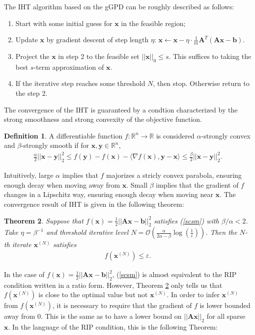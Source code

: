 \documentclass[11pt]{article}
\numberwithin{equation}{section}
\theoremstyle{plain}
\newtheorem{Th}{Theorem}[section]
\theoremstyle{definition}
\newtheorem{Def}[Th]{Definition}
\def\R{{\mathbb R}}
\def\R{{\mathbb R}}
\def\A{{\mathbf A}}
\def\x{{\mathbf x}}
\def\b{{\mathbf b}}
\def\e{{\varepsilon}}
\def\y{{\mathbf{y}}}
\begin{document}
The IHT algorithm based on the gGPD can be roughly described as follows:
\begin{enumerate}
\item Start with some initial guess for $\x$ in the feasible region;
\item Update $\x$ by gradient descent of step length $\eta$: $\x\leftarrow \x-\eta\cdot\frac{1}{m}\A^T(\A\x-\b)$.  
\item Project the $\x$ in step 2 to the feasible set $||\x||_0\leq s$. This suffices to taking the best $s$-term approximation of $\x$. 
\item If the iterative step reaches some threshold $N$, then stop. Otherwise return to the step 2. 
\end{enumerate}  

The convergence of the IHT is guaranteed by a condtion characterized by the strong smoothness and strong convexity of the objective function.
\begin{Def}
A differentiable function $f:\R^n\rightarrow\R$ is considered $\alpha$-strongly convex and $\beta$-strongly smooth if for $\x, \y\in\R^n$,
\begin{align}
\frac{\alpha}{2}||\x-\y||_2^2\leq f(\y)-f(\x)-\langle\nabla f(\x), \y-\x\rangle\leq\frac{\beta}{2}||\x-\y||_2^2.\label{scsm} 
\end{align}
\end{Def}
Intuitively, large $\alpha$ implies that $f$ majorizes a stricly convex parabola, ensuring enough decay when moving away from $\x$. Small $\beta$ implies that  the gradient of $f$ changes in a Lipschitz way, ensuring enough decay when moving near $\x$. The convergence result of IHT is given in the following theorem:
\begin{Th}\label{IHT-1}
Suppose that $f(\x)=\frac{1}{2}||\A\x-\b||_2^2$ satisfies (\ref{scsm}) with $\beta/\alpha<2$. Take $\eta=\beta^{-1}$ and threshold iterative level $N=\mathcal{O}\left(\frac{\alpha}{2\alpha-\beta}\log(\frac{1}{\e})\right)$. Then the $N$-th iterate $\x^{(N)}$ satisfies 
\begin{align}
f(\x^{(N)})\leq\e. 
\end{align} 
\end{Th}
In the case of $f(\x)=\frac{1}{2}||\A\x-\b||_2^2$, (\ref{scsm}) is almost equivalent to the RIP condition written in a ratio form. However, Theorem \ref{IHT-1} only tells us that $f(\x^{(N)})$ is close to the optimal value but not $\x^{(N)}$. In order to infer $\x^{(N)}$ from $f(\x^{(N)})$, it is necessary to require that the gradient of $f$ is lower bounded away from $0$. This is the same as to have a lower bound on $||\A\x||_2$ for all sparse $\x$. In the language of the RIP condition, this is the following Theorem:
\end{document}
